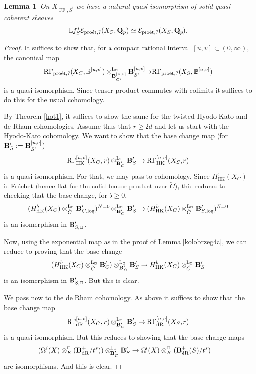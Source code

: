 \documentclass[10pt,reqno]{amsart}
\newtheorem{lemma}[equation]{Lemma}
\theoremstyle{definition}
\theoremstyle{remark}
\newcommand{\dr}{\operatorname{dR} }
\newcommand{\proeet}{\operatorname{pro\acute{e}t} }
\newcommand{\hk}{\operatorname{HK} }
\newcommand{\LL}{\operatorname{L} }
\newcommand{\FF}{\operatorname{FF} }
\newcommand{\se}{{\mathcal{E}}}
\numberwithin{equation}{section}
\def\R{{\mathrm R}}
\def\Q{{\bf Q}} \def\Z{{\bf Z}}
\numberwithin{equation}{section}
\begin{document}
\begin{lemma}\label{dziecko1} 
On $X_{\FF,S^{\flat}}$ we have a natural quasi-isomorphism of solid quasi-coherent sheaves
\begin{align*}
\LL\hskip-.4mm f^*_S\se_{\proeet,?}(X_C,\Q_p) \simeq \se_{\proeet,?}(X_S,\Q_p).
\end{align*}
\end{lemma}
\begin{proof}
It suffices to show that, for a compact rational interval $[u,v]\subset (0,\infty)$, 
the canonical map
$$\R\Gamma_{\proeet,?}(X_C,{\mathbb B}^{[u,v]})\otimes^{\LL_{\Box}}_{\B^{[u,v]}_{C^{\flat}}}
\B_{S^{\flat}}^{ [u,v]}{\to}\R\Gamma_{\proeet,?}(X_S,{\mathbb B}^{[u,v]})$$
is a quasi-isomorphism. Since tensor product commutes with colimits it suffices to do this for  the usual cohomology. 

  By  Theorem \ref{hot1}, it suffices to show the same for the twisted Hyodo-Kato and de Rham cohomologies. Assume thus that $r\geq 2d$
 and let us start  with the Hyodo-Kato cohomology. We want to show that  the  base change map 
(for ${\bf B}^{\prime}_S:={\bf B}_{S^{\flat}}^{[u,v]}$)
 $$
 \R\Gamma_{\hk}^{{[u,v]}}(X_C,r)\otimes^{\LL_{\Box}}_{\B^{\prime}_C} \B^{\prime}_{S} \to \R\Gamma_{\hk}^{{[u,v]}}(X_S,r)
  $$
 is a quasi-isomorphism. 
For that,  we may pass to cohomology. Since $H^j_{\hk}(X_C)$ is Fr\'echet (hence flat for the solid tensor product over $\breve{C}$),  this reduces
  to checking that the base change, for $b\geq 0$, 
$$
  (H^b_{\hk}(X_C)\otimes^{\LL_{\Box}}_{\breve{C}}\B^{\prime}_{C,\log})^{N=0}\otimes^{\LL_{\Box}}_{\B^{\prime}_C} \B^{\prime}_S
  \to  (H^b_{\hk}(X_C)\otimes^{\LL_{\Box}}_{\breve{C}}\B^{\prime}_{S,\log})^{N=0}
  $$
  is an isomorphism in ${\bf B}^{\prime}_{S, \Box}$. 
  
    Now,
     using the exponential map as in the proof of Lemma \ref{kolobrzeg4a},  we can  reduce  to proving that the base change
  $$
 (H^b_{\hk}(X_C)\otimes^{\LL_{\Box}}_{\breve{C}}\B^{\prime}_C)\otimes^{\LL_{\Box}}_{\B^{\prime}_C} \B^{\prime}_S
  \to  H^b_{\hk}(X_C)\otimes^{\LL_{\Box}}_{\breve{C}}\B^{\prime}_S
  $$
  is an isomorphism in ${\bf B}^{\prime}_{S,\Box}$. But this is clear. 
  
  
  
   We pass now to  the de Rham cohomology.  As above it suffices to show that the base change map
   $$
 \R\Gamma_{\dr}^{{[u,v]}}(X_C,r)\otimes^{\LL_{\Box}}_{\B^{\prime}_C} \B^{\prime}_{S} \to \R\Gamma_{\dr}^{{[u,v]}}(X_S,r)
  $$
 is a quasi-isomorphism. But this reduces to showing that the base change maps
 \begin{align*}
& (\Omega^i(X)\otimes^{\Box}_K(\B^+_{\dr}/t^s))
\otimes^{\LL_{\Box}}_{\B^{\prime}_C}\B^{\prime}_S\to  \Omega^i(X)\otimes^{\Box}_K(\B^+_{\dr}(S)/t^s)
 \end{align*}
 are isomorphisms. And this is clear.    
\end{proof}
\end{document}
